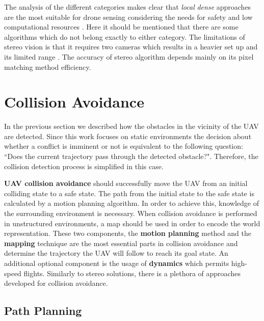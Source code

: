   The analysis of the different categories makes clear that \textit{local} \textit{dense }approaches are the most suitable for drone sensing considering the needs for safety and low computational resources \cite{Dijk}. Here it should be mentioned that there are some algorithms which do not belong exactly to either category. The limitations of stereo vision is that it requires two cameras which results in a heavier set up and its limited range \cite{Pinggera2014} \cite{Dijk}. The accuracy of stereo algorithm depends mainly on its pixel matching method efficiency. 


\section{Collision Avoidance}\label{ch:literature:obstacle_avoidance:navigation}

In the previous section we described how the obstacles in the vicinity of the \ac{UAV} are detected. Since this work focuses on static environments the decision about whether a conflict is imminent or not is equivalent to the following question: ``Does the current trajectory pass through the detected obstacle?". Therefore, the collision detection process is simplified in this case. 

\textbf{\ac{UAV} collision avoidance} should successfully move the \ac{UAV} from an initial colliding state to a safe state. The path from the initial state to the safe state is calculated by a motion planning algorithm. In order to achieve this, knowledge of the surrounding environment is necessary. When collision avoidance is performed in unstructured environments, a map should be used in order to encode the world representation. These two components, the \textbf{motion planning} method and the \textbf{mapping} technique are the most essential parts in collision avoidance and determine the trajectory the UAV will follow to reach its goal state. An additional optional component is the usage of \textbf{dynamics }which permits high-speed flights. Similarly to stereo solutions, there is a plethora of approaches developed for collision avoidance.

\subsection{Path Planning}

